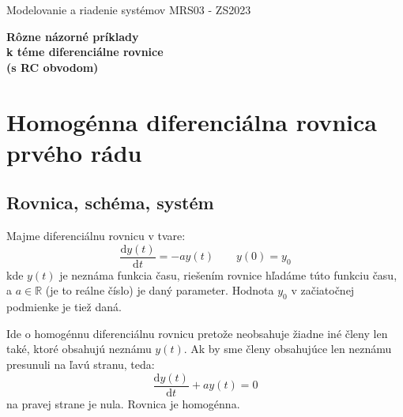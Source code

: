 \documentclass[a4paper, 10pt, ]{article}
\def\oznacenieCasti{MRS03 - ZS2023}
\begin{document}
\lstset{%
style=mystyle,
rangebeginprefix=\#\#\#\ cellB\ ,%
rangebeginsuffix=\ \#\#\#,%
rangeendprefix=\#\#\#\ cellE\ ,%
rangeendsuffix=\ \#\#\#,%
includerangemarker=false,
}






\fontsize{12pt}{22pt}\selectfont

\centerline{\textsf{Modelovanie a riadenie systémov} \hfill \textsf{\oznacenieCasti}}

\fontsize{18pt}{22pt}\selectfont







\begin{flushleft}
	\textbf{\textsf{Rôzne názorné príklady\\k téme diferenciálne rovnice\\(s RC obvodom)}}
\end{flushleft}





\normalsize

\bigskip

{\hypersetup{hidelinks}

\tableofcontents

}

\bigskip

\vspace{18pt}






\section{Homogénna diferenciálna rovnica prvého rádu}


\subsection{Rovnica, schéma, systém}

Majme diferenciálnu rovnicu v tvare:
\begin{equation} \label{hodrpr01}
    \frac{\text{d}y(t)}{\text{d}t} = - a y(t) \qquad y(0)=y_0
\end{equation}
kde $y(t)$ je neznáma funkcia času, riešením rovnice hľadáme túto funkciu času, a $a\in\mathbb{R}$ (je to reálne číslo) je daný parameter. Hodnota $y_0$ v začiatočnej podmienke je tiež daná.

Ide o homogénnu diferenciálnu rovnicu pretože neobsahuje žiadne iné členy len také, ktoré obsahujú neznámu $y(t)$. Ak by sme členy obsahujúce len neznámu presunuli na ľavú stranu, teda:
\begin{equation}
    \frac{\text{d}y(t)}{\text{d}t} + a y(t) = 0
\end{equation}
na pravej strane je nula. Rovnica je homogénna.
\end{document}
